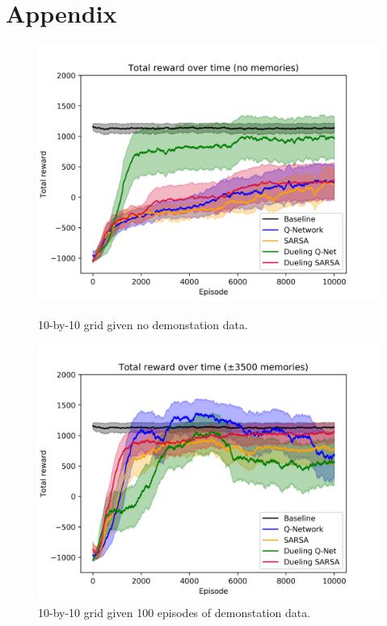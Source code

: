 \section{Appendix}\label{ap:appendix}
\begin{figure}[H]
    \centering
    \includegraphics[width=\linewidth]{img/results/10-sized/total_rewards_0m-min.png}
    \caption{10-by-10 grid given no demonstation data.}
    \label{fig:10sized-nomem}
    \includegraphics[width=\linewidth]{img/results/10-sized/total_rewards_100m-min.png}
    \caption{10-by-10 grid given 100 episodes of demonstation data.}
    \label{fig:10sized-100mem}

\end{figure}
